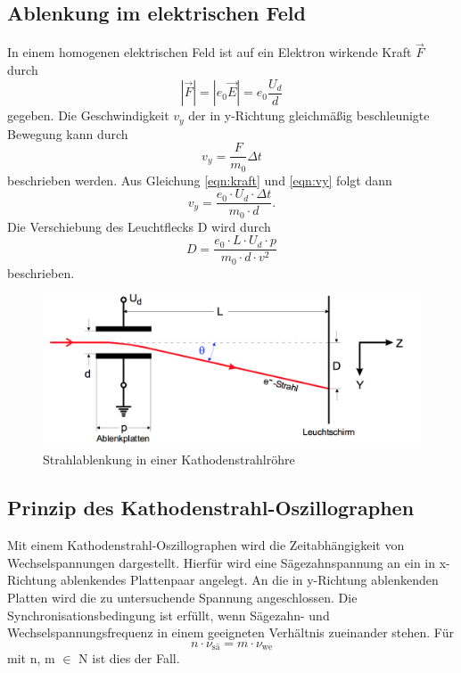 \subsection{Ablenkung im elektrischen Feld}
In einem homogenen elektrischen Feld ist auf ein Elektron wirkende Kraft $\vec{F}$ durch
\begin{equation}
  \label{eqn:kraft}
  |\vec{F}| = |e_0\vec{E}| = e_0\frac{U_d}{d}
\end{equation}
gegeben. Die Geschwindigkeit $v_y$ der in y-Richtung gleichmäßig beschleunigte Bewegung kann durch
\begin{equation}
  v_{y} = \frac{F}{m_0}{\Delta t}
  \label{eqn:vy}
\end{equation}
beschrieben werden. Aus Gleichung \ref{eqn:kraft} und \ref{eqn:vy} folgt dann
\begin{equation}
	v_{y} = \frac{e_0\cdot U_d\cdot\Delta t}{m_0\cdot d}.
\end{equation}
Die Verschiebung des Leuchtflecks D wird durch
\begin{equation}
	D = \frac{e_0\cdot L\cdot U_d\cdot p}{m_0 \cdot d\cdot v^2}
  \label{eqn:dud}
\end{equation}
beschrieben.
\newline
\begin{figure}
 \centering
  \includegraphics[scale=0.5]{ablenkunge.png}
  \caption{Strahlablenkung in einer Kathodenstrahlröhre\cite{Anleitung}}
  \label{fig:aufbaue}
\end{figure}
\newpage
\subsection{Prinzip des Kathodenstrahl-Oszillographen}
Mit einem Kathodenstrahl-Oszillographen wird die Zeitabhängigkeit von Wechselspannungen
dargestellt. Hierfür wird eine Sägezahnspannung an ein in x-Richtung ablenkendes
Plattenpaar angelegt. An die in y-Richtung ablenkenden Platten wird die zu untersuchende
Spannung angeschlossen. Die Synchronisationsbedingung ist erfüllt, wenn Sägezahn- und Wechselspannungsfrequenz
in einem geeigneten Verhältnis zueinander stehen. Für
\begin{equation}
n \cdot \nu_\text{sä} = m\cdot \nu_\text{we}
\end{equation}
\newline
mit n, m $\in$ N ist dies der Fall.
